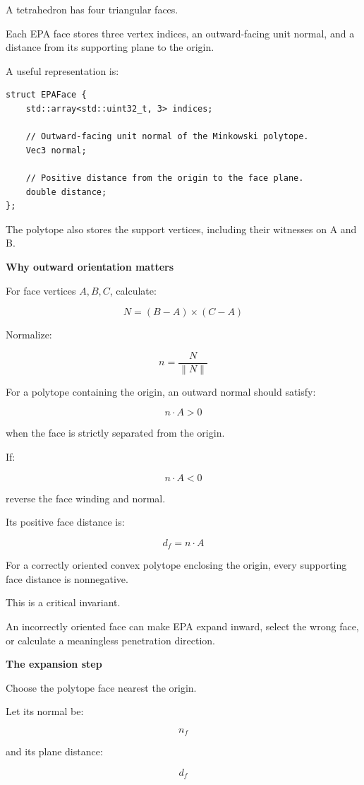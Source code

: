A tetrahedron has four triangular faces.

Each EPA face stores three vertex indices, an outward-facing unit normal, and a distance from its supporting plane to the origin.

A useful representation is:

\begin{verbatim}
struct EPAFace {
    std::array<std::uint32_t, 3> indices;

    // Outward-facing unit normal of the Minkowski polytope.
    Vec3 normal;

    // Positive distance from the origin to the face plane.
    double distance;
};
\end{verbatim}

The polytope also stores the support vertices, including their witnesses on A and B.

\textbf{Why outward orientation matters}

For face vertices \(A,B,C\), calculate:

\[
N=(B-A)\times(C-A)
\]

Normalize:

\[
n=\frac N{\|N\|}
\]

For a polytope containing the origin, an outward normal should satisfy:

\[
n\cdot A>0
\]

when the face is strictly separated from the origin.

If:

\[
n\cdot A<0
\]

reverse the face winding and normal.

Its positive face distance is:

\[
\boxed{ d_f=n\cdot A }
\]

For a correctly oriented convex polytope enclosing the origin, every supporting face distance is nonnegative.

This is a critical invariant.

An incorrectly oriented face can make EPA expand inward, select the wrong face, or calculate a meaningless penetration direction.

\textbf{The expansion step}

Choose the polytope face nearest the origin.

Let its normal be:

\[
n_f
\]

and its plane distance:

\[
d_f
\]

